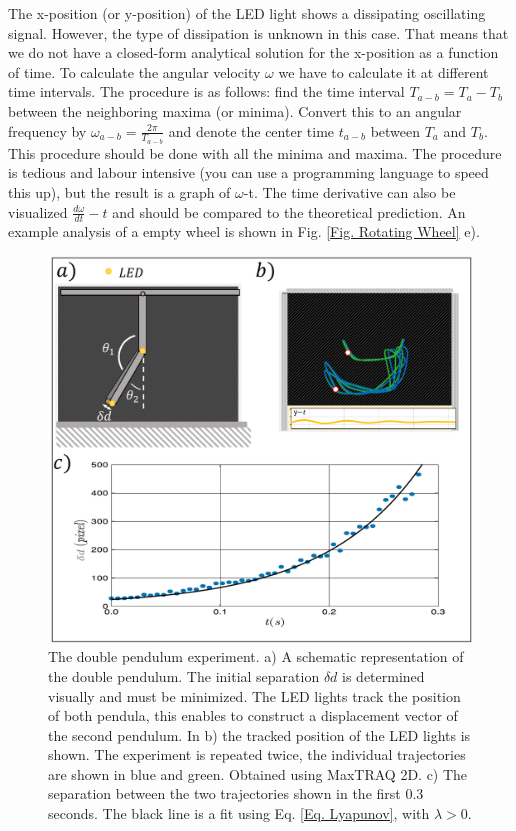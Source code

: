 \documentclass{article}
\begin{document}
The x-position (or y-position) of the LED light shows a dissipating oscillating signal. However, the type of dissipation is unknown in this case. That means that we do not have a closed-form analytical solution for the x-position as a function of time. To calculate the angular velocity $\omega$ we have to calculate it at different time intervals. The procedure is as follows: find the time interval $T_{a-b}=T_a-T_b$ between the neighboring maxima (or minima). Convert this to an angular frequency by $\omega_{a-b} = \frac{2\pi}{T_{a-b}}$ and denote the center time $t_{a-b}$ between $T_a$ and $T_b$. This procedure should be done with all the minima and maxima. The procedure is tedious and labour intensive (you can use a programming language to speed this up), but the result is a graph of $\omega$-t. The time derivative can also be visualized $\frac{d\omega}{dt}-t$ and should be compared to the theoretical prediction. An example analysis of a empty wheel is shown in Fig. \ref{Fig. Rotating Wheel} e).

\begin{figure}[H]
    \centering
    \includegraphics[width = 12cm]{figures/Lyapunov.pdf}
    \caption{The double pendulum experiment. a) A schematic representation of the double pendulum. The initial separation $\delta d$ is determined visually and must be minimized. The LED lights track the position of both pendula, this enables to construct a displacement vector of the second pendulum. In b) the tracked position of the LED lights is shown. The experiment is repeated twice, the individual trajectories are shown in blue and green. Obtained using MaxTRAQ 2D. c) The separation between the two trajectories shown in the first 0.3 seconds. The black line is a fit using Eq. \ref{Eq. Lyapunov}, with $\lambda > 0$. }
    \label{Fig. Lyapunov}
\end{figure}
\end{document}

